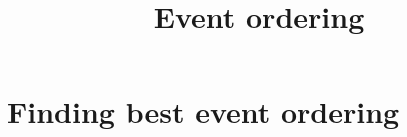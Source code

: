 \documentclass[11pt]{article}
\title{Event ordering}
\date{}
\begin{document}
\maketitle

\section{Finding best event ordering}
\label{sec:model}

\label{sec:model}

\label{sec:model}



%
%
\end{document}
